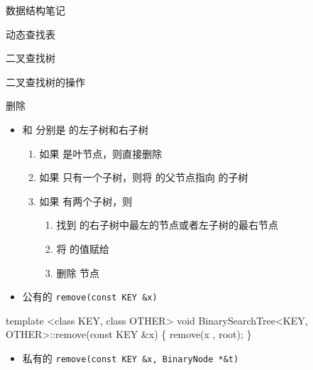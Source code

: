 \documentclass[
  ignorenonframetext,
]{beamer}
\newenvironment{Shaded}{}{}
\newcommand{\NormalTok}[1]{#1}
\providecommand{\tightlist}{%
  \setlength{\itemsep}{0pt}\setlength{\parskip}{0pt}}
\begin{document}
\begin{frame}[fragile]{数据结构笔记}
\begin{block}{动态查找表}
\begin{block}{二叉查找树}
\begin{block}{二叉查找树的操作}
\begin{block}{删除}
\protect{}\label{ux5220ux9664}
\begin{itemize}
\item
  {} 和 {} 分别是 {} 的左子树和右子树

  \begin{enumerate}
  \tightlist
  \item
    如果 {} 是叶节点，则直接删除
  \item
    如果 {} 只有一个子树，则将 {} 的父节点指向 {} 的子树
  \item
    如果 {} 有两个子树，则

    \begin{enumerate}
    \tightlist
    \item
      找到 {} 的右子树中最左的节点或者左子树的最右节点 {}
    \item
      将 {} 的值赋给 {}
    \item
      删除 {} 节点
    \end{enumerate}
  \end{enumerate}
\item
  公有的 \texttt{remove(const\ KEY\ \&x)}
\end{itemize}

\begin{Shaded}
\begin{Highlighting}[]
\NormalTok{template \textless{}class KEY, class OTHER\textgreater{}}
\NormalTok{void BinarySearchTree\textless{}KEY, OTHER\textgreater{}::remove(const KEY \&x)}
\NormalTok{\{}
\NormalTok{  remove(x , root);}
\NormalTok{\}}
\end{Highlighting}
\end{Shaded}

\begin{itemize}
\tightlist
\item
  私有的 \texttt{remove(const\ KEY\ \&x,\ BinaryNode\ *\&t)}
\end{itemize}


\end{block}
\end{block}
\end{block}
\end{block}
\end{frame}
\end{document}

